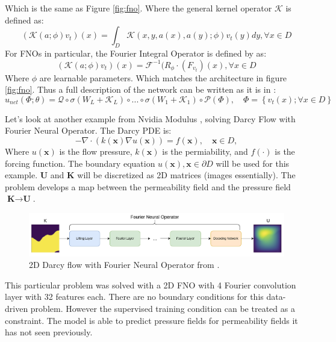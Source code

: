 \documentclass[]{article}
\begin{document}
Which is the same as Figure \ref{fig:fno}.  Where the general kernel operator $\mathcal{K}$ is defined as:
\begin{equation}
(\mathcal{K}(a;\phi)v_t)(x) = \int_{D} \mathcal{K}(x, y, a(x), a(y); \phi)v_t(y)dy, \forall x \in D
\end{equation}
For FNOs in particular, the Fourier Integral Operator is defined by \cite{fno} as:
\begin{equation}
(\mathcal{K}(a;\phi)v_t)(x) = \mathcal{F}^{-1}(R_{\phi}\cdot (F_{v_t})(x), \forall x \in D
\end{equation}
Where $\phi$ are learnable parameters.  Which matches the architecture in figure \ref{fig:fno}.  Thus a full description of the network can be written as it is in \cite{nvidia_modulus}:
\begin{equation}
u_{net}(\Phi;\theta) = \mathcal{Q}\circ \sigma(W_{L} + \mathcal{K}_{L}) \circ ... \circ \sigma(W_{1} + \mathcal{K}_{1})\circ \mathcal{P}(\Phi), \quad \Phi=\left\{v_t(x); \forall x \in D\right\}
\end{equation}

Let's look at another example from Nvidia Modulus \cite{nvidia_modulus}, solving Darcy Flow with Fourier Neural Operator.  The Darcy PDE is:
\begin{equation}
-\nabla \cdot \left(k(\textbf{x})\nabla u(\textbf{x})\right) = f(\textbf{x}), \quad \textbf{x} \in D,
\end{equation}
Where $u(\textbf{x})$ is the flow pressure, $k(\textbf{x})$ is the permiability, and $f(\cdot)$ is the forcing function.  The boundary equation $u(\textbf{x}), \textbf{x} \in \partial D$ will be used for this example.   $\textbf{U}$ and $\textbf{K}$ will be discretized as 2D matrices (images essentially).  The problem develops a map between the permeability field and the pressure field $\textbf{K} \rightarrow \textbf{U}$.
\begin{figure}
	\centering
	\includegraphics[width=1.0\linewidth]{images/fno_darcy}
	\caption[fno_darcy]{2D Darcy flow with Fourier Neural Operator from \cite{nvidia_modulus}. }
	\label{fig:fnodarcy}
\end{figure}
This particular problem was solved with a 2D FNO with 4 Fourier convolution layer with 32 features each.  There are no boundary conditions for this data-driven problem.  However the supervised training condition can be treated as a constraint.  The model is able to predict pressure fields for permeability fields it has not seen previously.
 
\end{document}
